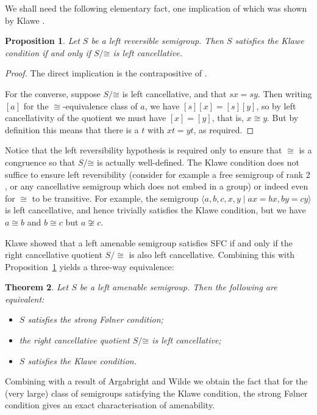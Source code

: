 \documentclass[11pt,a4paper,reqno]{amsart}
\newtheorem{theorem}{Theorem}[section]
\newtheorem{proposition}[theorem]{Proposition}
\begin{document}
We shall need the following elementary fact, one implication of which
was shown by Klawe \cite{Klawe77}.
\begin{proposition}\label{prop_klawecanc}
Let $S$ be a left reversible semigroup. Then $S$ satisfies the Klawe
condition if and only if $S / \mathord{\cong}$ is left cancellative.
\end{proposition}
\begin{proof}
The direct implication is the contrapositive of \cite[Lemma~2.1]{Klawe77}.

For the converse, suppose $S / \mathord{\cong}$ is left cancellative, and that
$sx = sy$. Then writing $[a]$ for the $\cong$-equivalence class of
$a$, we have $[s][x] = [s][y]$, so by left cancellativity of the quotient
we must have $[x] = [y]$, that is, $x \cong y$. But by definition this means that
there is a $t$ with $xt = yt$, as required.
\end{proof}
Notice that the left reversibility hypothesis is required only to ensure
that $\cong$ is a congruence so that $S / \mathord{\cong}$ is actually well-defined. 
The Klawe condition does not suffice to ensure left reversibility (consider
for example a free semigroup of rank $2$, or any cancellative semigroup
which does not embed in a group) or indeed even for $\cong$ to be transitive.
For example, the semigroup
$\langle a, b, c, x, y \mid ax = bx, by = cy \rangle$
is left cancellative, and hence trivially satisfies the Klawe condition,
but we have $a \cong b$ and $b \cong c$ but $a \not\cong c$.

Klawe \cite[Theorem~2.2]{Klawe77} showed that a left amenable semigroup satisfies
SFC if and only if the right cancellative quotient $S  / \cong$
is also left cancellative. Combining this with Proposition~\ref{prop_klawecanc}
yields a three-way equivalence:

\begin{theorem}\label{thm_klawe}
Let $S$ be a left amenable semigroup. Then the following are equivalent:
\begin{itemize}
\item[(i)] $S$ satisfies the strong F\o lner condition;
\item[(ii)] the right cancellative quotient $S / \mathord{\cong}$ is left cancellative;
\item[(iii)] $S$ satisfies the Klawe condition.
\end{itemize}
\end{theorem}

Combining with a result of Argabright and Wilde \cite{Argabright67} we obtain the fact that
for the (very large) class of semigroups satisfying the Klawe condition, the strong F\o lner condition
gives an exact characterisation of amenability.
\end{document}
